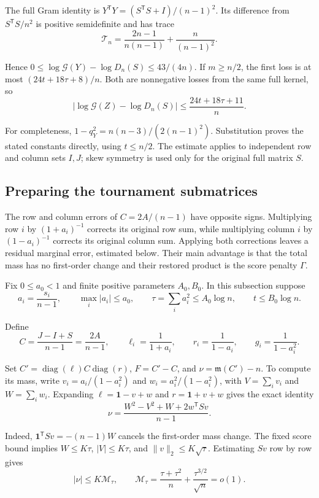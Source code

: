 \documentclass[11pt,a4paper]{article}
\begin{document}
The full Gram identity is \(Y^{\mathsf T}Y=(S^{\mathsf T}S+I)/(n-1)^2\). Its difference from \(S^{\mathsf T}S/n^2\) is positive semidefinite and has trace
\[\mathcal T_n=\frac{2n-1}{n(n-1)}+\frac n{(n-1)^2}.\]

Hence \(0\le\log\mathcal G(Y)-\log D_n(S)\le43/(4n)\). If \(m\ge n/2\), the first loss is at most \((24t+18\tau+8)/n\). Both are nonnegative losses from the same full kernel, so
\[|\log\mathcal G(Z)-\log D_n(S)|\le\frac{24t+18\tau+11}{n}.\]

For completeness, \(1-q_Y^2=n(n-3)/(2(n-1)^2)\). Substitution proves the stated constants directly, using \(t\le n/2\). The estimate applies to independent row and column sets \(I,J\); skew symmetry is used only for the original full matrix \(S\).

\subsection{Preparing the tournament submatrices}\label{sec-6.3}

The row and column errors of \(C=2A/(n-1)\) have opposite signs. Multiplying row \(i\) by \((1+a_i)^{-1}\) corrects its original row sum, while multiplying column \(i\) by \((1-a_i)^{-1}\) corrects its original column sum. Applying both corrections leaves a residual marginal error, estimated below. Their main advantage is that the total mass has no first-order change and their restored product is the score penalty \(\Gamma\).

Fix \(0\le a_0<1\) and finite positive parameters \(A_0,B_0\). In this subsection suppose
\[a_i=\frac{s_i}{n-1},\qquad \max_i|a_i|\le a_0,\qquad \tau=\sum_i a_i^2\le A_0\log n,\qquad t\le B_0\log n.\]

Define
\[C=\frac{J-I+S}{n-1}=\frac{2A}{n-1},\qquad \ell_i=\frac1{1+a_i},\qquad r_i=\frac1{1-a_i},\qquad g_i=\frac1{1-a_i^2}.\]

Set \(C'=\operatorname{diag}(\ell)C\operatorname{diag}(r)\), \(F=C'-C\), and \(\nu=\mathfrak m(C')-n\). To compute its mass, write \(v_i=a_i/(1-a_i^2)\) and \(w_i=a_i^2/(1-a_i^2)\), with \(V=\sum_i v_i\) and \(W=\sum_i w_i\). Expanding \(\ell=\mathbf 1-v+w\) and \(r=\mathbf 1+v+w\) gives the exact identity
\[\nu=\frac{W^2-V^2+W+2w^{\mathsf T}Sv}{n-1}.\]

Indeed, \(\mathbf 1^{\mathsf T}Sv=-(n-1)W\) cancels the first-order mass change. The fixed score bound implies \(W\le K\tau\), \(|V|\le K\tau\), and \(\|v\|_2\le K\sqrt\tau\). Estimating \(Sv\) row by row gives
\[|\nu|\le K\mathcal M_\tau,\qquad \mathcal M_\tau=\frac{\tau+\tau^2}{n}+\frac{\tau^{3/2}}{\sqrt n}=o(1).\]
\end{document}
